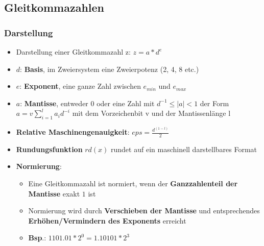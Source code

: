 \subsection{Gleitkommazahlen}%
\label{gl:sub:gleitkommazahlen}
\subsubsection{Darstellung}%
\label{gl:ssub:darstellung}
\begin{itemize}
	\item Darstellung einer Gleitkommazahl z: $z = a * d^e$
	\item $d$: \textbf{Basis}, im Zweiersystem eine Zweierpotenz (2, 4, 8 etc.)
	\item $e$: \textbf{Exponent}, eine ganze Zahl zwischen $e_{min}$ und $e_{max}$
	\item $a$: \textbf{Mantisse}, entweder 0 oder eine Zahl mit $d^{-1} \leq |a| < 1$ der Form $a = v \sum_{i = 1}^{l} a_id^{-i}$ mit dem Vorzeichenbit v und der Mantissenlänge l
	\item \textbf{Relative Maschinengenauigkeit}: $eps = \frac{d^{(1-l)}}{2}$
	\item \textbf{Rundungsfunktion} $rd(x)$ rundet auf ein maschinell darstellbares Format
	\item \textbf{Normierung}:
	\begin{itemize}
		\item Eine Gleitkommazahl ist normiert, wenn der \textbf{Ganzzahlenteil der Mantisse} exakt $1$ ist
		\item Normierung wird durch \textbf{Verschieben der Mantisse} und entsprechendes \textbf{Erhöhen/Vermindern des Exponents} erreicht
		\item \textbf{Bsp}.: $1101.01 * 2^0 = 1.10101 * 2^3$
	\end{itemize}
\end{itemize}
\newpage
